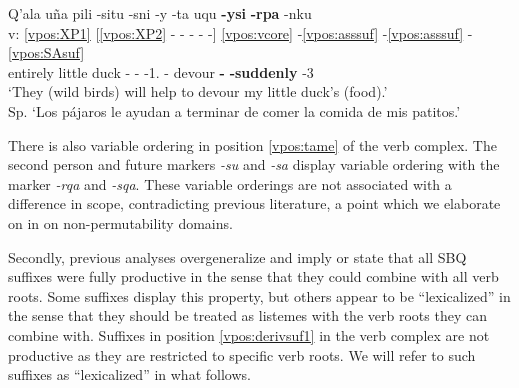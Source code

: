 \documentclass[output=paper]{langscibook}
\begin{document}
\ea \label{ex:ysirpa}{
	\glll {} Q'ala uña pili -situ -sni -y -ta uqu \textbf{-ysi} \textbf{-rpa} -nku \\
        v: \ref{vpos:XP1} [\ref{vpos:XP2} - - - - -] \ref{vpos:vcore} -\ref{vpos:asssuf} -\ref{vpos:asssuf} -\ref{vpos:SAsuf} \\
		{} entirely little duck -\Aff{} -\Pl{} -1\Sg{}.\Poss{} -\Acc{} devour \textbf{-\Assist{}} \textbf{-suddenly}  -3\Pl{}	\\
	\glt `They (wild birds) will help to devour my little duck's (food).' \\ Sp. `Los pájaros le ayudan a terminar de comer la comida de mis patitos.' \hfill }
\z

There is also variable ordering in position \ref{vpos:tame} of the verb complex. The second person and future markers \textit{-su} and \textit{-sa} display variable ordering with the marker \textit{-rqa} and \textit{-sqa}. These variable orderings are not associated with a difference in scope, contradicting previous literature, a point which we elaborate on in  on non-permutability domains.

Secondly, previous analyses overgeneralize and imply or state that all SBQ suffixes were fully productive in the sense that they could combine with all verb roots. Some suffixes display this property, but others appear to be ``lexicalized'' in the sense that they should be treated as listemes with the verb roots they can combine with. Suffixes in position \ref{vpos:derivsuf1} in the verb complex are not productive as they are restricted to specific verb roots. We will refer to such suffixes as ``lexicalized'' in what follows.
\end{document}
